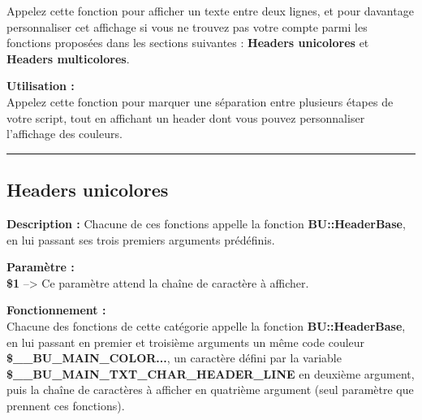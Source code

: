 \documentclass[a4paper,10pt]{article}
\begin{document}
\begin{justify}
    Appelez cette fonction pour afficher un texte entre deux lignes, et pour davantage personnaliser cet affichage si vous ne trouvez pas votre compte parmi les fonctions proposées dans les sections suivantes : \textbf{\color{green}Headers unicolores} et \textbf{\color{green}Headers multicolores}.
\end{justify}

\begin{justify}
    \textbf{Utilisation :}\\
    Appelez cette fonction pour marquer une séparation entre plusieurs étapes de votre script, tout en affichant un header dont vous pouvez personnaliser l'affichage des couleurs.
\end{justify}




\color{green}\par\noindent\rule{\textwidth}{0.4pt}\color{white}

\color{green}
\subsection{Headers unicolores}\color{white}

\begin{justify}
    \textbf{Description :}
    Chacune de ces fonctions appelle la fonction \textbf{\color{mauve}BU::HeaderBase}, en lui passant ses trois premiers arguments prédéfinis.
\end{justify}

\begin{justify}
    \textbf{Paramètre :}\\
    \textbf{\color{orange}\$1} --> Ce paramètre attend la chaîne de caractère à afficher.
\end{justify}

\begin{justify}
    \textbf{Fonctionnement :}\\
    Chacune des fonctions de cette catégorie appelle la fonction \textbf{\color{mauve}BU::HeaderBase}, en lui passant en premier et troisième arguments un même code couleur \textbf{\color{orange}\$\_\_BU\_MAIN\_COLOR...}, un caractère défini par la variable \textbf{\color{orange}\$\_\_BU\_MAIN\_TXT\_CHAR\_HEADER\_LINE} en deuxième argument, puis la chaîne de caractères à afficher en quatrième argument (seul paramètre que prennent ces fonctions).
\end{justify}
\end{document}
